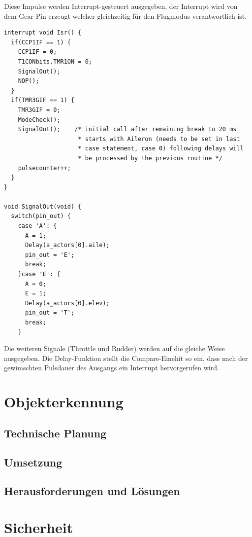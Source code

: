     Diese Impulse werden Interrupt-gesteuert ausgegeben, der Interrupt wird von dem Gear-Pin erzeugt welcher gleichzeitig für den Flugmodus verantwortlich ist.

    \lstset{language = c}
    \begin{lstlisting}
interrupt void Isr() {
  if(CCP1IF == 1) {
    CCP1IF = 0;
    T1CONbits.TMR1ON = 0;
    SignalOut();
    NOP();
  }
  if(TMR3GIF == 1) {
    TMR3GIF = 0;
    ModeCheck();
    SignalOut();    /* initial call after remaining break to 20 ms
                     * starts with Aileron (needs to be set in last
                     * case statement, case 0) following delays will
                     * be processed by the previous routine */
    pulsecounter++;
  }
}

void SignalOut(void) {
  switch(pin_out) {
    case 'A': {
      A = 1;
      Delay(a_actors[0].aile);
      pin_out = 'E';
      break;
    }case 'E': {
      A = 0;
      E = 1;
      Delay(a_actors[0].elev);
      pin_out = 'T';
      break;
    }
    \end{lstlisting}
    Die weiteren Signale (Throttle und Rudder) werden auf die gleiche Weise ausgegeben.
    Die Delay-Funktion stellt die Compare-Einehit so ein, dass nach der gewünschten Pulsdauer des Ausgangs ein Interrupt hervorgerufen wird.

\section{Objekterkennung}

  \subsection{Technische Planung}

  \subsection{Umsetzung}

  \subsection{Herausforderungen und Lösungen}

\section{Sicherheit}

